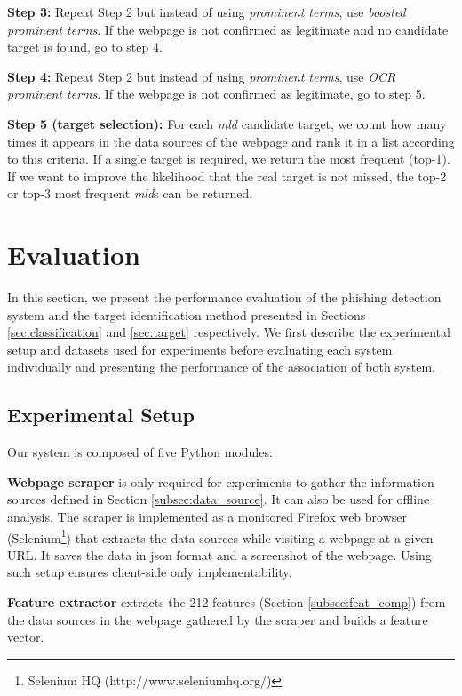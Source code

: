\documentclass[10pt,conference,compsocconf,letterpaper]{IEEEtran}
\begin{document}
\noindent\textbf{Step 3:}
Repeat Step 2 but instead of using \textit{prominent terms}, use \textit{boosted prominent terms}. If the webpage is not confirmed as legitimate and no candidate target is found, go to step 4.

\noindent\textbf{Step 4:}
Repeat Step 2 but instead of using \textit{prominent terms}, use \textit{OCR prominent terms}. If the webpage is not confirmed as legitimate, go to step 5.

\noindent\textbf{Step 5 (target selection):}
For each \textit{mld} candidate target, we count how many times it appears in the data sources of the webpage and rank it in a list according to this criteria.
If a single target is required, we return the most frequent (top-1). If we want to improve the likelihood that the real target is not missed, the top-2 or top-3 most frequent \textit{mld}s can be returned.
\section{Evaluation}

In this section, we present the performance evaluation of the phishing detection system and the target identification method presented in Sections \ref{sec:classification} and \ref{sec:target} respectively. 
\iffullversion
We first describe the experimental setup and datasets used for experiments before evaluating each system individually and presenting the performance of the association of both system. 
\fi

\subsection{Experimental Setup}

Our system is composed of five Python modules:

\noindent\textbf{Webpage scraper} is only required for experiments to gather the information sources defined in Section \ref{subsec:data_source}. It can also be used for offline analysis. The scraper is implemented as a monitored Firefox web browser (Selenium\footnote{Selenium HQ (http://www.seleniumhq.org/)}) that extracts the data sources while visiting a webpage at a given URL. It saves the data in json format and a screenshot of the webpage. 
\iffullversion
Using such setup ensures client-side only implementability.
\fi

\noindent\textbf{Feature extractor} extracts the 212 features (Section \ref{subsec:feat_comp}) from the data sources in the webpage
\iffullversion
gathered by the scraper 
\fi
and builds a feature vector.
\end{document}
